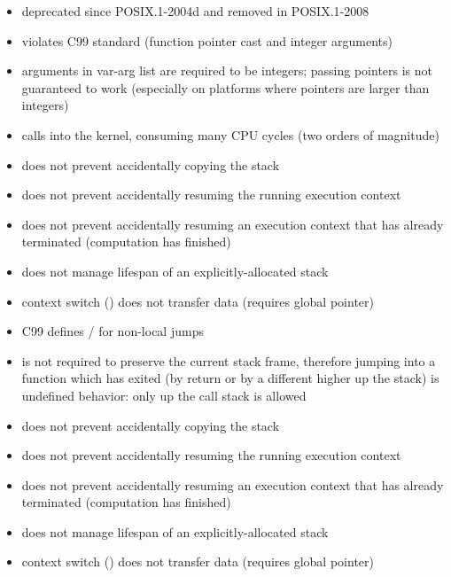 
\begin{itemize}
    \item deprecated since POSIX.1-2004d and removed in POSIX.1-2008
    \item {} violates C99 standard (function pointer cast and integer arguments)
    \item {} arguments in var-arg list are required to be integers; passing pointers
        is not guaranteed to work (especially on platforms where pointers are larger than integers)
    \item {} calls into the kernel, consuming many CPU cycles (two orders
        of magnitude)
    \item does not prevent accidentally copying the stack
    \item does not prevent accidentally resuming the running execution
        context
    \item does not prevent accidentally resuming an execution context that has already
        terminated (computation has finished)
    \item does not manage lifespan of an explicitly-allocated stack
    \item context switch () does not transfer data (requires global pointer)
\end{itemize}


\begin{itemize}
    \item C99 defines \sj / \lj for non-local jumps
    \item \lj is not required to preserve the current stack frame, therefore jumping into a function
        which has exited (by return or by a different \lj higher up the stack) is undefined behavior:
        only \lj up the call stack is allowed
    \item does not prevent accidentally copying the stack
    \item does not prevent accidentally resuming the running execution
        context
    \item does not prevent accidentally resuming an execution context that has already
        terminated (computation has finished)
    \item does not manage lifespan of an explicitly-allocated stack
    \item context switch (\lj) does not transfer data (requires global pointer)
\end{itemize}
